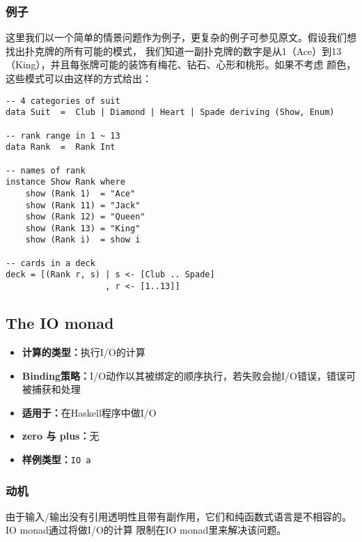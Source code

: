 \subsubsection{例子}
\indent{}这里我们以一个简单的情景问题作为例子，更复杂的例子可参见原文。假设我们想找出扑克牌的所有可能的模式，
我们知道一副扑克牌的数字是从1（Ace）到13（King），并且每张牌可能的装饰有梅花、钻石、心形和桃形。如果不考虑
颜色，这些模式可以由这样的方式给出：
\begin{verbatim}
-- 4 categories of suit
data Suit  =  Club | Diamond | Heart | Spade deriving (Show, Enum)

-- rank range in 1 ~ 13
data Rank  =  Rank Int

-- names of rank
instance Show Rank where
    show (Rank 1)  = "Ace"
    show (Rank 11) = "Jack"
    show (Rank 12) = "Queen"
    show (Rank 13) = "King"
    show (Rank i)  = show i

-- cards in a deck
deck = [(Rank r, s) | s <- [Club .. Spade]
                    , r <- [1..13]]
\end{verbatim}
\clearpage

\subsection{The IO monad}
\begin{itemize}[leftmargin=*,topsep=0pt,itemsep=0pt]
\item \textbf{计算的类型：}执行I/O的计算
\item \textbf{Binding策略：}I/O动作以其被绑定的顺序执行，若失败会抛I/O错误，错误可被捕获和处理
\item \textbf{适用于：}在Haskell程序中做I/O
\item \textbf{zero 与 plus：}无
\item \textbf{样例类型：}\texttt{IO a}
\end{itemize}

\vspace{-0.5em}
\subsubsection{动机}
\vspace{-0.5em}
\indent{}由于输入/输出没有引用透明性且带有副作用，它们和纯函数式语言是不相容的。IO monad通过将做I/O的计算
限制在IO monad里来解决该问题。

